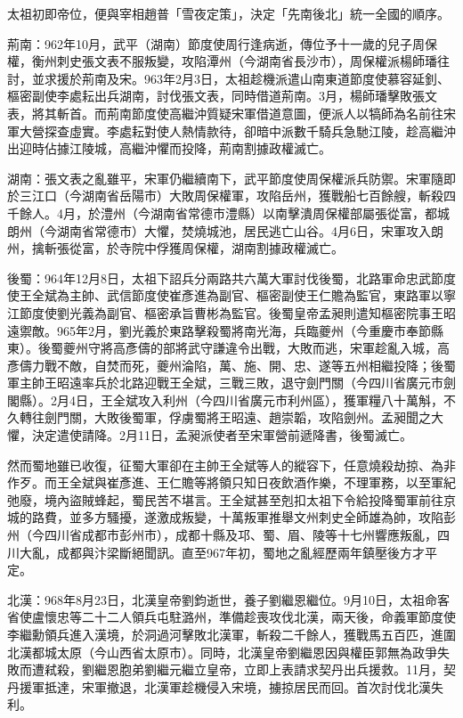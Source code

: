 太祖初即帝位，便與宰相趙普「雪夜定策」，決定「先南後北」統一全國的順序。

荊南：962年10月，武平（湖南）節度使周行逢病逝，傳位予十一歲的兒子周保權，衡州刺史張文表不服叛變，攻陷潭州（今湖南省長沙市），周保權派楊師璠往討，並求援於荊南及宋。963年2月3日，太祖趁機派遣山南東道節度使慕容延釗、樞密副使李處耘出兵湖南，討伐張文表，同時借道荊南。3月，楊師璠擊敗張文表，將其斬首。而荊南節度使高繼沖質疑宋軍借道意圖，便派人以犒師為名前往宋軍大營探查虛實。李處耘對使人熱情款待，卻暗中派數千騎兵急馳江陵，趁高繼沖出迎時佔據江陵城，高繼沖懼而投降，荊南割據政權滅亡。

湖南：張文表之亂雖平，宋軍仍繼續南下，武平節度使周保權派兵防禦。宋軍隨即於三江口（今湖南省岳陽市）大敗周保權軍，攻陷岳州，獲戰船七百餘艘，斬殺四千餘人。4月，於澧州（今湖南省常德市澧縣）以南擊潰周保權部屬張從富，都城朗州（今湖南省常德市）大懼，焚燒城池，居民逃亡山谷。4月6日，宋軍攻入朗州，擒斬張從富，於寺院中俘獲周保權，湖南割據政權滅亡。

後蜀：964年12月8日，太祖下詔兵分兩路共六萬大軍討伐後蜀，北路軍命忠武節度使王全斌為主帥、武信節度使崔彥進為副官、樞密副使王仁贍為監官，東路軍以寧江節度使劉光義為副官、樞密承旨曹彬為監官。後蜀皇帝孟昶則遣知樞密院事王昭遠禦敵。965年2月，劉光義於東路擊殺蜀將南光海，兵臨夔州（今重慶市奉節縣東）。後蜀夔州守將高彥儔的部將武守謙違令出戰，大敗而逃，宋軍趁亂入城，高彥儔力戰不敵，自焚而死，夔州淪陷，萬、施、開、忠、遂等五州相繼投降；後蜀軍主帥王昭遠率兵於北路迎戰王全斌，三戰三敗，退守劍門關（今四川省廣元市劍閣縣）。2月4日，王全斌攻入利州（今四川省廣元市利州區），獲軍糧八十萬斛，不久轉往劍門關，大敗後蜀軍，俘虜蜀將王昭遠、趙崇韜，攻陷劍州。孟昶聞之大懼，決定遣使請降。2月11日，孟昶派使者至宋軍營前遞降書，後蜀滅亡。

然而蜀地雖已收復，征蜀大軍卻在主帥王全斌等人的縱容下，任意燒殺劫掠、為非作歹。而王全斌與崔彥進、王仁贍等將領只知日夜飲酒作樂，不理軍務，以至軍紀弛廢，境內盜賊蜂起，蜀民苦不堪言。王全斌甚至剋扣太祖下令給投降蜀軍前往京城的路費，並多方騷擾，遂激成叛變，十萬叛軍推舉文州刺史全師雄為帥，攻陷彭州（今四川省成都市彭州市），成都十縣及邛、蜀、眉、陵等十七州響應叛亂，四川大亂，成都與汴梁斷絕聞訊。直至967年初，蜀地之亂經歷兩年鎮壓後方才平定。

北漢：968年8月23日，北漢皇帝劉鈞逝世，養子劉繼恩繼位。9月10日，太祖命客省使盧懷忠等二十二人領兵屯駐潞州，準備趁喪攻伐北漢，兩天後，命義軍節度使李繼勳領兵進入漢境，於洞過河擊敗北漢軍，斬殺二千餘人，獲戰馬五百匹，進圍北漢都城太原（今山西省太原市）。同時，北漢皇帝劉繼恩因與權臣郭無為政爭失敗而遭弒殺，劉繼恩胞弟劉繼元繼立皇帝，立即上表請求契丹出兵援救。11月，契丹援軍抵達，宋軍撤退，北漢軍趁機侵入宋境，擄掠居民而回。首次討伐北漢失利。

